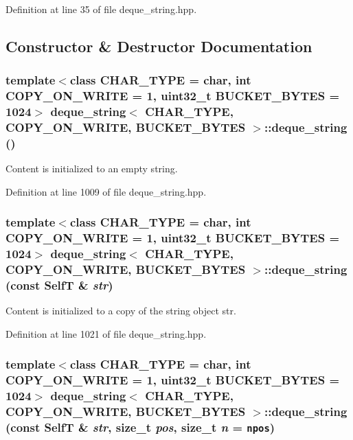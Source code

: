 Definition at line 35 of file deque\_\-string.hpp.

\subsection{Constructor \& Destructor Documentation}
\hypertarget{classdeque__string_58a95023c19819f6bbc152a5a764be24}{
\subsubsection[{deque\_\-string}]{\setlength{\rightskip}{0pt plus 5cm}template$<$class CHAR\_\-TYPE  = char, int COPY\_\-ON\_\-WRITE = 1, uint32\_\-t BUCKET\_\-BYTES = 1024$>$ {\bf deque\_\-string}$<$ CHAR\_\-TYPE, COPY\_\-ON\_\-WRITE, BUCKET\_\-BYTES $>$::{\bf deque\_\-string} ()}}
\label{classdeque__string_58a95023c19819f6bbc152a5a764be24}


Content is initialized to an empty string. 

Definition at line 1009 of file deque\_\-string.hpp.\hypertarget{classdeque__string_370593eb79336a2b06b0110eb6341807}{
\subsubsection[{deque\_\-string}]{\setlength{\rightskip}{0pt plus 5cm}template$<$class CHAR\_\-TYPE  = char, int COPY\_\-ON\_\-WRITE = 1, uint32\_\-t BUCKET\_\-BYTES = 1024$>$ {\bf deque\_\-string}$<$ CHAR\_\-TYPE, COPY\_\-ON\_\-WRITE, BUCKET\_\-BYTES $>$::{\bf deque\_\-string} (const {\bf SelfT} \& {\em str})}}
\label{classdeque__string_370593eb79336a2b06b0110eb6341807}


Content is initialized to a copy of the string object str. 

Definition at line 1021 of file deque\_\-string.hpp.\hypertarget{classdeque__string_bdf7279246355a4f6f20fa2f977ea581}{
\subsubsection[{deque\_\-string}]{\setlength{\rightskip}{0pt plus 5cm}template$<$class CHAR\_\-TYPE  = char, int COPY\_\-ON\_\-WRITE = 1, uint32\_\-t BUCKET\_\-BYTES = 1024$>$ {\bf deque\_\-string}$<$ CHAR\_\-TYPE, COPY\_\-ON\_\-WRITE, BUCKET\_\-BYTES $>$::{\bf deque\_\-string} (const {\bf SelfT} \& {\em str}, \/  size\_\-t {\em pos}, \/  size\_\-t {\em n} = {\tt {\bf npos}})}}
\label{classdeque__string_bdf7279246355a4f6f20fa2f977ea581}


